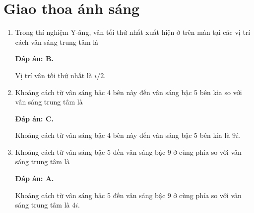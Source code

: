 \section{Giao thoa ánh sáng}
\begin{enumerate}[label=\bfseries Câu \arabic*:]
	\item {} 
	
	\cauhoi
	{Trong thí nghiệm Y-âng, vân tối thứ nhất xuất hiện ở trên màn tại các vị trí cách vân sáng trung tâm là
	}
	
	\loigiai
	{		\textbf{Đáp án: B.}
		
Vị trí vân tối thứ nhất là $ i/2 $.
		
	}
	
	\item {}
	
	\cauhoi
	{Khoảng cách từ vân sáng bậc 4 bên này đến vân sáng bậc 5 bên kia so với vân sáng trung tâm là
	}
	
	\loigiai
	{		\textbf{Đáp án: C.}
		
Khoảng cách từ vân sáng bậc 4 bên này đến vân sáng bậc 5 bên kia là $ 9i $.
	}
	
	\item {} 
	
	\cauhoi
	{Khoảng cách từ vân sáng bậc 5 đến vân sáng bậc 9 ở cùng phía so với vân sáng trung tâm là
	}
	
	\loigiai
	{		\textbf{Đáp án: A.}
		
Khoảng cách từ vân sáng bậc 5 đến vân sáng bậc 9 ở cùng phía so với vân sáng trung tâm là $ 4i $.
	}
	

\end{enumerate}
